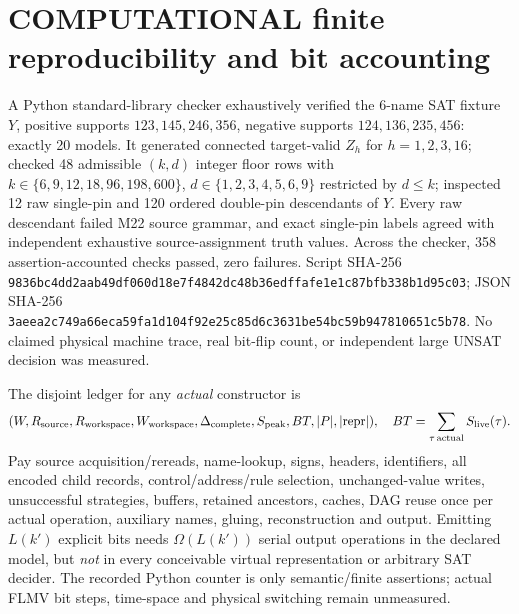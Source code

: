 \documentclass[11pt]{article}
\begin{document}
\section{COMPUTATIONAL finite reproducibility and bit accounting}
A Python standard-library checker exhaustively verified the 6-name SAT fixture \(Y\), positive supports \(123,145,246,356\), negative supports \(124,136,235,456\): exactly 20 models. It generated connected target-valid \(Z_h\) for \(h=1,2,3,16\); checked 48 admissible \((k,d)\) integer floor rows with \(k\in\{6,9,12,18,96,198,600\}\), \(d\in\{1,2,3,4,5,6,9\}\) restricted by \(d\le k\); inspected 12 raw single-pin and 120 ordered double-pin descendants of \(Y\). Every raw descendant failed M22 source grammar, and exact single-pin labels agreed with independent exhaustive source-assignment truth values. Across the checker, 358 assertion-accounted checks passed, zero failures. Script SHA-256 \texttt{9836bc4dd2aab49df060d18e7f4842dc48b36edffafe1e1c87bfb338b1d95c03}; JSON SHA-256 \texttt{3aeea2c749a66eca59fa1d104f92e25c85d6c3631be54bc59b947810651c5b78}. No claimed physical machine trace, real bit-flip count, or independent large UNSAT decision was measured.

The disjoint ledger for any \emph{actual} constructor is
\[
(W,R_{\rm source},R_{\rm workspace},W_{\rm workspace},
\Delta_{\rm complete},S_{\rm peak},BT,|P|,|\mathrm{repr}|),
\quad BT=\sum_{\tau\,\mathrm{actual}}S_{\rm live}(\tau).
\]
Pay source acquisition/rereads, name-lookup, signs, headers, identifiers, all encoded child records, control/address/rule selection, unchanged-value writes, unsuccessful strategies, buffers, retained ancestors, caches, DAG reuse once per actual operation, auxiliary names, gluing, reconstruction and output. Emitting \(L(k')\) explicit bits needs \(\Omega(L(k'))\) serial output operations in the declared model, but \emph{not} in every conceivable virtual representation or arbitrary SAT decider. The recorded Python counter is only semantic/finite assertions; actual FLMV bit steps, time-space and physical switching remain unmeasured.
\end{document}
